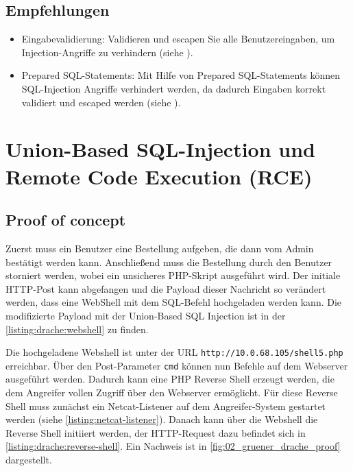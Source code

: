 \subsection*{Empfehlungen} 
\begin{itemize}
    \item Eingabevalidierung: Validieren und escapen Sie alle Benutzereingaben, um Injection-Angriffe zu verhindern (siehe \cite{owaspInputValidation}).
    \item Prepared SQL-Statements: Mit Hilfe von Prepared SQL-Statements können SQL-Injection Angriffe verhindert werden, da dadurch Eingaben korrekt validiert und escaped werden (siehe \cite{owaspSQLInjectionPrevention}).
\end{itemize}


\section{\makecvssbadge Union-Based SQL-Injection und Remote Code Execution (RCE)}

\subsection*{Proof of concept}
Zuerst muss ein Benutzer eine Bestellung aufgeben, die dann vom Admin bestätigt werden kann. Anschließend muss die Bestellung durch den Benutzer storniert werden, wobei ein unsicheres PHP-Skript ausgeführt wird. Der initiale HTTP-Post kann abgefangen und die Payload dieser Nachricht so verändert werden, dass eine WebShell mit dem SQL-Befehl hochgeladen werden kann. Die modifizierte Payload mit der Union-Based SQL Injection ist in der \autoref{listing:drache:webshell} zu finden. 

Die hochgeladene Webshell ist unter der URL \texttt{http://10.0.68.105/shell5.php} erreichbar. Über den Post-Parameter \texttt{cmd} können nun Befehle auf dem Webserver ausgeführt werden. Dadurch kann eine PHP Reverse Shell erzeugt werden, die dem Angreifer vollen Zugriff über den Webserver ermöglicht. Für diese Reverse Shell muss zunächst ein Netcat-Listener auf dem Angreifer-System gestartet werden (siehe \autoref{listing:netcat-listener}). Danach kann über die Webshell die Reverse Shell initiiert werden, der HTTP-Request dazu befindet sich in \autoref{listing:drache:reverse-shell}. Ein Nachweis ist in \autoref{fig:02_gruener_drache_proof} dargestellt.

